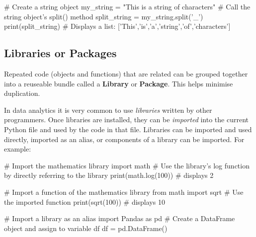 \begin{pycode}
    # Create a string object
    my_string = "This is a string of characters"
    # Call the string object's split() method
    split_string = my_string.split('_')
    print(split_string) 
    # Displays a  list: ['This','is','a','string','of','characters']
\end{pycode}

\subsection{Libraries or Packages}

Repeated code (objects and functions) that are related can be grouped together into a reuseable bundle called a \textbf{Library} or \textbf{Package}. This helps minimise duplication.

In data analytics it is very common to use \textit{libraries} written by other programmers. Once libraries are installed, they can be \textit{imported} into the current Python file and used by the code in that file. Libraries can be imported and used directly, imported as an alias, or components of a library can be imported. For example:

\begin{pycode}
    # Import the mathematics library
    import math
    # Use the library's log function by directly referring to the library
    print(math.log(100)) # displays 2

    # Import a function of the mathematics library
    from math import sqrt
    # Use the imported function
    print(sqrt(100)) # displays 10

    # Import a library as an alias
    import Pandas as pd
    # Create a DataFrame object and assign to variable df
    df = pd.DataFrame()
\end{pycode}